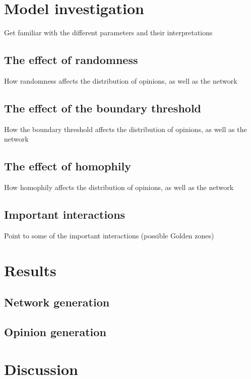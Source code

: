 \documentclass[9pt,twocolumn,twoside]{ilcss}
\begin{document}
\section{Model investigation}

Get familiar with the different parameters and their interpretations

\subsection{The effect of randomness}

How randomness affects the distribution of opinions, as well as the network

\subsection{The effect of the boundary threshold}

How the boundary threshold affects the distribution of opinions, as well as the network

\subsection{The effect of homophily}

How homophily affects the distribution of opinions, as well as the network

\subsection{Important interactions}

Point to some of the important interactions (possible Golden zones)

\section{Results}

\subsection{Network generation}

\subsection{Opinion generation}

\section{Discussion}
\end{document}
